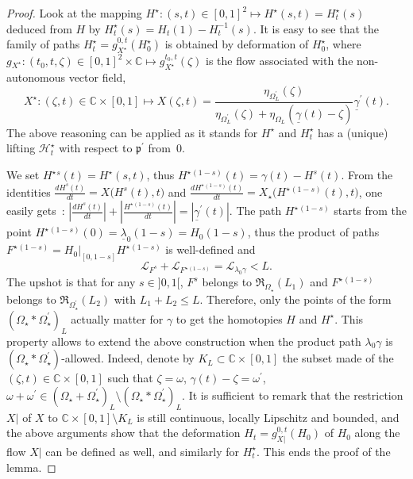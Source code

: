 \documentclass[11pt, english]{smfart}
\theoremstyle{definition}
\begin{document}
\begin{proof}
Look at the mapping $H^\star : (s,t) \in [0,1]^2 \mapsto
H^\star(s,t)=H_t^\star(s)$ deduced from $H$ by $H_t^\star(s) =
H_t(1)-H_t^{-1}(s)$. It is easy to see that the family of paths
$H_t^\star = g_{X^\star}^{0,t}(H_0^\star)$ is obtained by deformation  of $H_0^\star$, where
$g{_{X^\star} : (t_0,t,\zeta) \in [0,1]^2 \times \mathbb{C} \mapsto
  g_{X^\star}^{t_0,t}(\zeta)}$ is 
the flow associated with the non-autonomous vector
field,
$$X^\star : (\zeta,t) \in \mathbb{C} \times [0,1] \mapsto X(\zeta,t) =
\frac{\eta_{\Omega_L^\prime}(\zeta)}{\eta_{\Omega_L^\prime}(\zeta)+\eta_{\Omega_L}(\underline{\gamma}(t)-
  \zeta)}\underline{\gamma}^\prime (t).$$ 
The above reasoning can be applied as it stands for $H^\star$ and
$H_t^\star$ has a (unique) lifting $\mathcal{H}_t^\star$ with respect to 
$\mathfrak{p}^\prime$ from~$0$. 

We set ${H^\star}{^{s}}(t)=H^\star(s,t)$, thus ${H^\star}{^{(1-s)}}(t) = \gamma(t)-H^s(t)$.
From the identities $\displaystyle \frac{dH^s(t)}{dt} = X\big(H^s(t),t
\big)$ and
$\displaystyle \frac{d{H^\star}{^{(1-s)}}(t)}{dt} =
X_\star\big({H^\star}{^{(1-s)}}(t),t \big)$,
one easily gets~: $\displaystyle \left| \frac{dH^s(t)}{dt}\right|+
\left|
  \frac{{H^\star}{^{(1-s)}}(t)}{dt}\right|=|\underline{\gamma}^\prime(t)|$. The
 path ${H^\star}{^{(1-s)}}$ starts from the point ${{H^\star}{^{(1-s)}}(0)=
\underline{\lambda}_0(1-s)=H_0(1-s)}$, thus the product of paths 
${F^\star}{^{(1-s)}} = H_0|_{[0,1-s]} {H^\star}{^{(1-s)}}$ is
well-defined and
$$\mathcal{L}_{F^s}+\mathcal{L}_{{F^\star}{^{(1-s)}}}=\mathcal{L}_{\lambda_0
  \gamma} <L.$$
The upshot is that for any $s \in ]0,1[$, $F^s$ belongs to
$\mathfrak{R}_{\Omega_\star}(L_1)$ and ${F^\star}{^{(1-s)}}$ belongs to
$\mathfrak{R}_{\Omega_\star^\prime}(L_2)$ with $L_1+L_2 \leq L$. 
Therefore, only the points of the form $(\Omega_\star \ast
\Omega_\star^\prime)_L$ actually matter
for $\gamma$ to get the homotopies $H$ and $H^\star$. This
property allows to extend the above construction when 
the product path $\lambda_0 \gamma$ is 
$(\Omega_\star \ast \Omega_\star^\prime)$-allowed. Indeed, denote by
$K_L \subset \mathbb{C}\times [0,1]$
the subset made of the $(\zeta,t) \in \mathbb{C}\times [0,1]$ such
that $\zeta=\omega$, $\gamma(t)-\zeta = \omega^\prime$,
$\omega+\omega^\prime \in (\Omega_\star + \Omega_\star^\prime)_L
\setminus (\Omega_\star \ast
\Omega_\star^\prime)_L$. It is sufficient to remark that 
the restriction  $X|$ of $X$ to $\mathbb{C}\times
[0,1] \setminus K_L$ is still continuous, locally Lipschitz  and bounded, and the above
arguments show that the deformation $H_t = g_{X|}^{0,t}(H_0)$ of
$H_0$ along the flow $X|$ can be defined as well, and similarly for $H_t^\star$.
This ends the proof of the lemma.
\end{proof}
\end{document}
